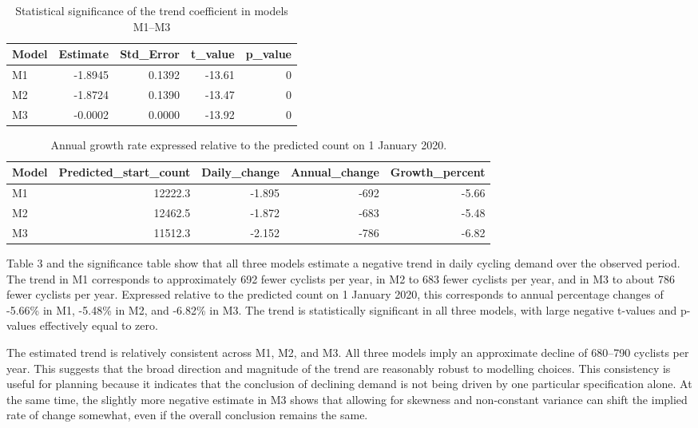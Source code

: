 \documentclass[
]{article}
\begin{document}
\begin{table}

\caption{\label{tab:unnamed-chunk-8}Statistical significance of the trend coefficient in models M1--M3}
\centering
\begin{tabular}[t]{lrrrr}
\toprule
Model & Estimate & Std\_Error & t\_value & p\_value\\
\midrule
M1 & -1.8945 & 0.1392 & -13.61 & 0\\
M2 & -1.8724 & 0.1390 & -13.47 & 0\\
M3 & -0.0002 & 0.0000 & -13.92 & 0\\
\bottomrule
\end{tabular}
\end{table}

\begin{table}

\caption{\label{tab:unnamed-chunk-9}Annual growth rate expressed relative to the predicted count on 1 January 2020.}
\centering
\begin{tabular}[t]{lrrrr}
\toprule
Model & Predicted\_start\_count & Daily\_change & Annual\_change & Growth\_percent\\
\midrule
M1 & 12222.3 & -1.895 & -692 & -5.66\\
M2 & 12462.5 & -1.872 & -683 & -5.48\\
M3 & 11512.3 & -2.152 & -786 & -6.82\\
\bottomrule
\end{tabular}
\end{table}

Table 3 and the significance table show that all three models estimate a negative trend in daily cycling demand over the observed period. The trend in M1 corresponds to approximately 692 fewer cyclists per year, in M2 to 683 fewer cyclists per year, and in M3 to about 786 fewer cyclists per year. Expressed relative to the predicted count on 1 January 2020, this corresponds to annual percentage changes of -5.66\% in M1, -5.48\% in M2, and -6.82\% in M3. The trend is statistically significant in all three models, with large negative t-values and p-values effectively equal to zero.

The estimated trend is relatively consistent across M1, M2, and M3. All three models imply an approximate decline of 680--790 cyclists per year. This suggests that the broad direction and magnitude of the trend are reasonably robust to modelling choices. This consistency is useful for planning because it indicates that the conclusion of declining demand is not being driven by one particular specification alone. At the same time, the slightly more negative estimate in M3 shows that allowing for skewness and non-constant variance can shift the implied rate of change somewhat, even if the overall conclusion remains the same.
\end{document}
